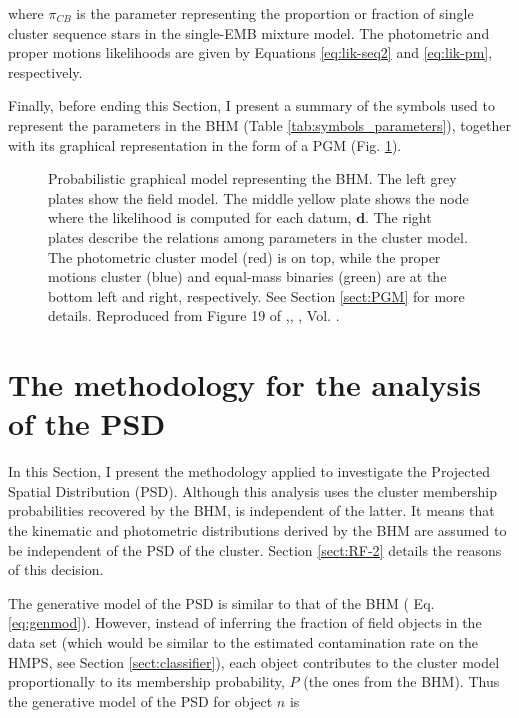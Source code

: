 where $\pi_{CB}$ is the parameter representing the proportion or fraction of single cluster sequence stars in the single-EMB mixture model. The photometric and proper motions likelihoods are given by Equations \ref{eq:lik-seq2} and \ref{eq:lik-pm}, respectively.

Finally, before ending this Section, I present a summary of the symbols used to represent the parameters in the BHM (Table \ref{tab:symbols_parameters}), together with its graphical representation in the form of a PGM (Fig. \ref{fig:PGMBHM}).



\begin{figure}[H]
  \begin{center}
  \resizebox{0.8\textwidth}{!}{}
  \end{center}
  \caption{Probabilistic graphical model representing the BHM. The left grey plates show the field model. The middle yellow plate shows the node where the likelihood is computed for each datum, $\boldsymbol{d}$. The right plates describe the relations among parameters in the cluster model. The photometric cluster model (red) is on top, while the proper motions cluster (blue) and equal-mass binaries (green) are at the bottom left and right, respectively. See Section \ref{sect:PGM} for more details. Reproduced from Figure 19 of \citet{Olivares2017},\textit{}, , Vol. .}
  \label{fig:PGMBHM}
\end{figure}

\section{The methodology for the analysis of the PSD}
\label{sect:PSDmethod}

In this Section, I present the methodology applied to investigate the Projected Spatial Distribution (PSD). Although this analysis uses the cluster membership probabilities recovered by the BHM, is independent of the latter. It means that the kinematic and photometric distributions derived by the  BHM are assumed to be independent of the PSD of the cluster. Section \ref{sect:RF-2} details the reasons of this decision. 

The generative model of the PSD is similar to that of the BHM ( Eq. \ref{eq:genmod}). However, instead of inferring the fraction of field objects in the data set (which would be similar to the estimated contamination rate on the HMPS, see Section \ref{sect:classifier}), each object contributes to the cluster model proportionally to its membership probability, $P$ (the ones from the BHM). Thus the generative model of the PSD for object $n$ is

